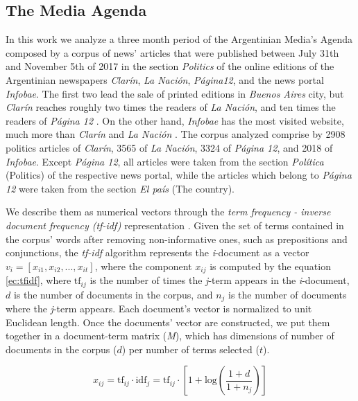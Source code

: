 \documentclass{bmcart}
\begin{document}
\subsection*{The Media Agenda}
\par In this work we analyze a three month period of the Argentinian Media's Agenda composed by a corpus of news' articles that were published between July 31th and November 5th of 2017 in the section \emph{Politics} of the online editions of the Argentinian newspapers \emph{Clar\'in}, \emph{La Naci\'on}, \emph{P\'agina12}, and the news portal \emph{Infobae}. The first two lead the sale of printed editions in \emph{Buenos Aires} city, but \emph{Clar\'in} reaches roughly two times the readers of \emph{La Naci\'on}, and ten times the readers of \emph{P\'agina 12} \cite{IVC}. On the other hand, \emph{Infobae} has the most visited website, much more than \emph{Clar\'in} and \emph{La Naci\'on} \cite{AlexaAR}.
The corpus analyzed comprise by 2908 politics articles of \emph{Clar\'in}, 3565 of \emph{La Naci\'on}, 3324 of \emph{P\'agina 12}, and 2018 of \emph{Infobae}. Except \emph{P\'agina 12}, all articles were taken from the section \emph{Pol\'itica}  (Politics) of the respective news portal, while the articles which belong to \emph{P\'agina 12} were taken from the section \emph{El pa\'is} (The country).

\par We describe them as numerical vectors through the \textit{term frequency - inverse document frequency (tf-idf)} representation \cite{xu2003document}. Given the set of terms contained in the corpus' words after removing non-informative ones, such as prepositions and conjunctions, the \textit{tf-idf} algorithm represents the \textit{i}-document as a vector $v_i = [x_{i1}, x_{i2}, ... , x_{it}]$, where the component $x_{ij}$ is computed by the equation \ref{ec:tfidf}, where $\textrm{tf}_{ij}$ is the number of times the \textit{j}-term appears in the \textit{i}-document, $d$ is the number of documents in the corpus, and $n_j$ is the number of documents where the \textit{j}-term appears. Each document's vector is normalized to unit Euclidean length. Once the documents' vector are constructed, we put them together in a document-term matrix (\emph{M}), which has dimensions of number of documents in the corpus ($d$) per number of terms selected ($t$).

\begin{equation}
x_{ij} = \textrm{tf}_{ij} \cdot \textrm{idf}_{j} = \textrm{tf}_{ij} \cdot [1 + \textrm{log}(\frac{1 + d}{1 + n_j})] 
\label{ec:tfidf}
\end{equation}
\end{document}
